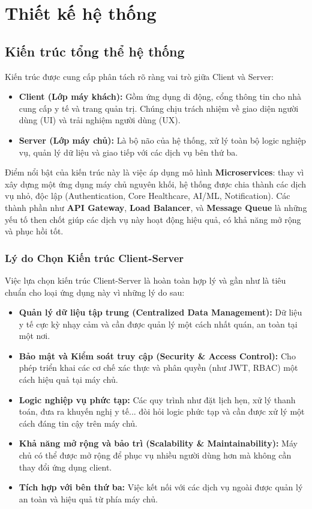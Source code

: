 \chapter{Thiết kế hệ thống}
\section{Kiến trúc tổng thể hệ thống}
Kiến trúc được cung cấp phân tách rõ ràng vai trò giữa Client và Server:
\begin{itemize}
    \item \textbf{Client (Lớp máy khách):} Gồm ứng dụng di động, cổng thông tin cho nhà cung cấp y tế và trang quản trị. Chúng chịu trách nhiệm về giao diện người dùng (UI) và trải nghiệm người dùng (UX).
    \item \textbf{Server (Lớp máy chủ):} Là bộ não của hệ thống, xử lý toàn bộ logic nghiệp vụ, quản lý dữ liệu và giao tiếp với các dịch vụ bên thứ ba.
\end{itemize}
Điểm nổi bật của kiến trúc này là việc áp dụng mô hình \textbf{Microservices}: thay vì xây dựng một ứng dụng máy chủ nguyên khối, hệ thống được chia thành các dịch vụ nhỏ, độc lập (Authentication, Core Healthcare, AI/ML, Notification). Các thành phần như \textbf{API Gateway}, \textbf{Load Balancer}, và \textbf{Message Queue} là những yếu tố then chốt giúp các dịch vụ này hoạt động hiệu quả, có khả năng mở rộng và phục hồi tốt.

\subsection{Lý do Chọn Kiến trúc Client-Server}
Việc lựa chọn kiến trúc Client-Server là hoàn toàn hợp lý và gần như là tiêu chuẩn cho loại ứng dụng này vì những lý do sau:
\begin{itemize}[leftmargin=*]
    \item \textbf{Quản lý dữ liệu tập trung (Centralized Data Management):} Dữ liệu y tế cực kỳ nhạy cảm và cần được quản lý một cách nhất quán, an toàn tại một nơi.
    \item \textbf{Bảo mật và Kiểm soát truy cập (Security \& Access Control):} Cho phép triển khai các cơ chế xác thực và phân quyền (như JWT, RBAC) một cách hiệu quả tại máy chủ.
    \item \textbf{Logic nghiệp vụ phức tạp:} Các quy trình như đặt lịch hẹn, xử lý thanh toán, đưa ra khuyến nghị y tế... đòi hỏi logic phức tạp và cần được xử lý một cách đáng tin cậy trên máy chủ.
    \item \textbf{Khả năng mở rộng và bảo trì (Scalability \& Maintainability):} Máy chủ có thể được mở rộng để phục vụ nhiều người dùng hơn mà không cần thay đổi ứng dụng client.
    \item \textbf{Tích hợp với bên thứ ba:} Việc kết nối với các dịch vụ ngoài được quản lý an toàn và hiệu quả từ phía máy chủ.
\end{itemize}

